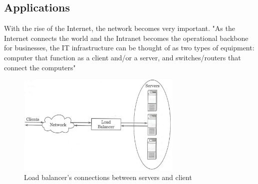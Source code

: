\documentclass[12p]{article}
\begin{document}
	\subsection{Applications}
	With the rise of the Internet, the network becomes very important. "As the Internet connects the world and the Intranet becomes the operational backbone for businesses, the IT infrastructure can be thought of as two types of equipment: computer that function as a client and/or a server, and switches/routers that connect the computers"\cite{lb_SFC}\\
	\begin{figure}[h!]
		\centering
		\includegraphics[width=0.7\textwidth]{img/basic.png}
		\caption{Load balancer's connections between servers and client}
	\end{figure}
	
\end{document}
